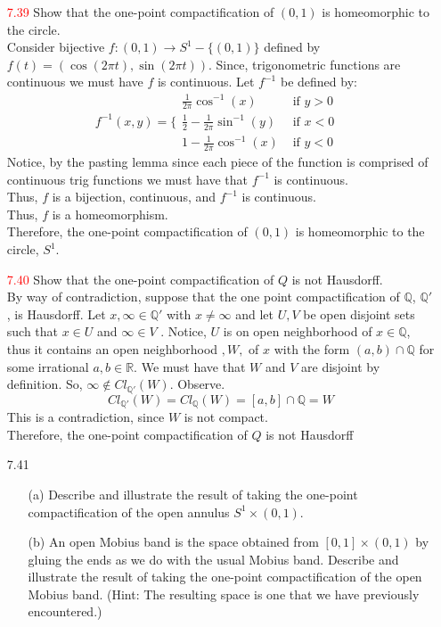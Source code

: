 \documentclass[12pt]{article}
\newcommand{\R}{\mathbb{R}}
\newcommand{\Q}{\mathbb{Q}}
\newcommand{\ak}[1]{\textcolor{red}{#1}}
\begin{document}
\begin{enumerate}
	
		\item[\ak{7.39}] Show that the one-point compactification of $( 0,1 )$ is homeomorphic to the
		circle.\\
		Consider bijective $ f:(0,1)\rightarrow S^1-\{(0,1)\} $ defined by $ f(t)=(\cos(2\pi t), \sin(2\pi t)) $. Since, trigonometric functions are continuous we must have $ f $ is continuous. Let $ f^{-1} $ be defined by:
			\[f^{-1}(x,y)=\{\begin{array} {ll} 
					{\frac{1}{2\pi}\cos^{-1}(x)} & {\text{ if  $y > 0$ }} \\
					{\frac{1}{2}-\frac{1}{2\pi}\sin^{-1}(y)} & {\text { if $x < 0$}}\\
					{1-\frac{1}{2\pi}\cos^{-1}(x)} & {\text { if $y < 0$}}  
		  	\end{array}\] 
		Notice, by the pasting lemma since each piece of the function is comprised of continuous trig functions we must have that $ f^{-1} $ is continuous.\\
		Thus, $ f $ is a bijection, continuous, and $ f^{-1} $ is continuous.\\
		Thus, $ f $ is a homeomorphism.\\
		Therefore, the one-point compactification of $( 0,1 )$ is homeomorphic to the
		circle, $ S^1 $.	
		\item[\ak{7.40}] Show that the one-point compactification of $Q$ is not Hausdorff.\\
		By way of contradiction, suppose that the one point compactification of $ \Q $, $ \Q' $, is Hausdorff. Let $ x, \infty \in \Q'  $ with $ x\neq \infty $ and let $ U,V $ be open disjoint sets such that $ x\in U $ and $ \infty\in V $ . Notice, $ U $ is on open neighborhood of $ x \in \Q $, thus it contains an open neighborhood $ ,W, $ of $ x $ with the form $ (a,b)\cap \Q$ for some irrational $ a,b\in\R $. We must have that $ W $ and $ V $ are disjoint by definition. So, $ \infty \not\in Cl_{\Q'}(W) $. Observe.
			\[Cl_{\Q'}(W)=Cl_\Q(W)=[a,b]\cap\Q=W\]
		This is a contradiction, since $ W $ is not compact.\\
		Therefore, the one-point compactification of $Q$ is not Hausdorff	
		\item[7.41]
		\begin{enumerate}
			\item[(a)] Describe and illustrate the result of taking the one-point compactification
			of the open annulus $S ^ { 1 } \times ( 0,1 ) .$
			
			\item[(b)] An open Mobius band is the space obtained from $[ 0,1 ] \times ( 0,1 )$ by gluing
			the ends as we do with the usual Mobius band. Describe and illustrate the
			result of taking the one-point compactification of the open Mobius band.
			(Hint: The resulting space is one that we have previously encountered.)
		\end{enumerate}
		

\end{enumerate}
\end{document}
